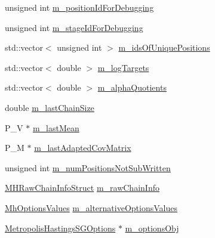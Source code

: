 \begin{DoxyCompactItemize}
unsigned int \hyperlink{class_q_u_e_s_o_1_1_metropolis_hastings_s_g_a49500f5107190c94813e232cd806c2bc}{m\-\_\-position\-Id\-For\-Debugging}
\item 
unsigned int \hyperlink{class_q_u_e_s_o_1_1_metropolis_hastings_s_g_aca9351ab468808759b8b19686231ae4f}{m\-\_\-stage\-Id\-For\-Debugging}
\item 
std\-::vector$<$ unsigned int $>$ \hyperlink{class_q_u_e_s_o_1_1_metropolis_hastings_s_g_ad1916a22b4a53ba67fa87f93c6e0a252}{m\-\_\-ids\-Of\-Unique\-Positions}
\item 
std\-::vector$<$ double $>$ \hyperlink{class_q_u_e_s_o_1_1_metropolis_hastings_s_g_ac33a6e46e05c20c071a46ecf58a9291c}{m\-\_\-log\-Targets}
\item 
std\-::vector$<$ double $>$ \hyperlink{class_q_u_e_s_o_1_1_metropolis_hastings_s_g_a6fd65985afd80114ece8b2b5fffe658d}{m\-\_\-alpha\-Quotients}
\item 
double \hyperlink{class_q_u_e_s_o_1_1_metropolis_hastings_s_g_a005d221d1c458ff767ed03304ca4cd6f}{m\-\_\-last\-Chain\-Size}
\item 
P\-\_\-\-V $\ast$ \hyperlink{class_q_u_e_s_o_1_1_metropolis_hastings_s_g_a9741f56d947e9d7967af91c6ea083b56}{m\-\_\-last\-Mean}
\item 
P\-\_\-\-M $\ast$ \hyperlink{class_q_u_e_s_o_1_1_metropolis_hastings_s_g_a1c73b49339c8a1015d95a890d7882331}{m\-\_\-last\-Adapted\-Cov\-Matrix}
\item 
unsigned int \hyperlink{class_q_u_e_s_o_1_1_metropolis_hastings_s_g_a60695940f442f6568d10ee9e456032c7}{m\-\_\-num\-Positions\-Not\-Sub\-Written}
\item 
\hyperlink{struct_q_u_e_s_o_1_1_m_h_raw_chain_info_struct}{M\-H\-Raw\-Chain\-Info\-Struct} \hyperlink{class_q_u_e_s_o_1_1_metropolis_hastings_s_g_ac531509489028853bb17c0353fc9eafd}{m\-\_\-raw\-Chain\-Info}
\item 
\hyperlink{class_q_u_e_s_o_1_1_mh_options_values}{Mh\-Options\-Values} \hyperlink{class_q_u_e_s_o_1_1_metropolis_hastings_s_g_add6eb8fa2e706ef1de9772f71c84d839}{m\-\_\-alternative\-Options\-Values}
\item 
\hyperlink{class_q_u_e_s_o_1_1_metropolis_hastings_s_g_options}{Metropolis\-Hastings\-S\-G\-Options} $\ast$ \hyperlink{class_q_u_e_s_o_1_1_metropolis_hastings_s_g_a5d0bc9f73d50d272aa6bfb5ef5939ef3}{m\-\_\-options\-Obj}
\end{DoxyCompactItemize}
